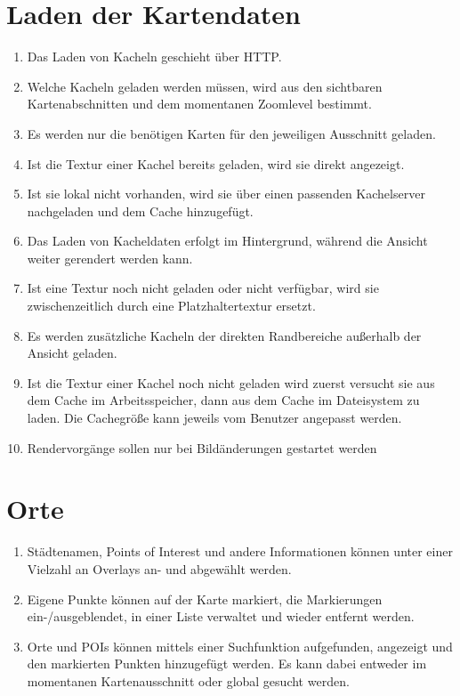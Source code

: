 \documentclass[10pt]{scrreprt}
\begin{document}
\section{Laden der Kartendaten}
\begin{enumerate}[resume,leftmargin=2.5cm]
\item Das Laden von Kacheln geschieht über HTTP.
\item Welche Kacheln geladen werden müssen, wird  aus den sichtbaren Kartenabschnitten und dem momentanen Zoomlevel bestimmt.
\item Es werden nur die benötigen Karten für den jeweiligen Ausschnitt geladen.
\item Ist die Textur einer Kachel bereits geladen, wird sie direkt angezeigt.
\item Ist sie lokal nicht vorhanden, wird sie über einen passenden Kachelserver nachgeladen und dem Cache hinzugefügt.
\item Das Laden von Kacheldaten erfolgt im Hintergrund, während die Ansicht weiter gerendert werden kann.
\wunsch
\item Ist eine Textur noch nicht geladen oder nicht verfügbar, wird sie zwischenzeitlich durch eine Platzhaltertextur ersetzt.
\item Es werden zusätzliche Kacheln der direkten Randbereiche außerhalb der Ansicht geladen.
\item Ist die Textur einer Kachel noch nicht geladen wird zuerst versucht sie aus dem Cache im Arbeitsspeicher, dann aus dem Cache im Dateisystem zu laden. Die Cachegröße kann jeweils vom Benutzer angepasst werden.
\item Rendervorgänge sollen nur bei Bildänderungen gestartet werden
\end{enumerate}



\section{Orte}
\begin{enumerate}[leftmargin=2.5cm,resume]
\item Städtenamen, Points of Interest und andere Informationen können unter einer Vielzahl an Overlays an- und abgewählt werden.
\wunsch
\item Eigene Punkte können auf der Karte markiert, die Markierungen ein-/ausgeblendet, in einer Liste verwaltet und wieder entfernt werden. 
\item Orte und POIs können mittels einer Suchfunktion aufgefunden, angezeigt und den markierten Punkten hinzugefügt werden. Es kann dabei entweder im momentanen Kartenausschnitt oder global gesucht werden.
\end{enumerate}
\end{document}
